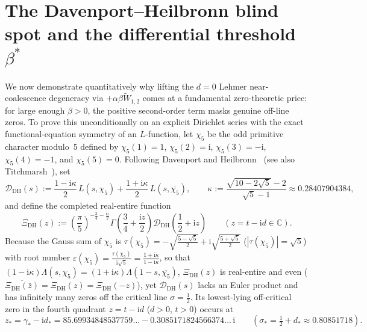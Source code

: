 \documentclass[11pt,reqno]{amsart}
\theoremstyle{definition}
\theoremstyle{remark}
\numberwithin{equation}{section}
\newcommand{\C}{\mathbb{C}}
\newcommand{\ii}{\mathrm{i}}
\begin{document}
\section{The Davenport--Heilbronn blind spot and the differential threshold $\beta^*$}\label{sec:dh_blind_spot}

We now demonstrate quantitatively why lifting the $d = 0$ Lehmer near-coalescence degeneracy via $+\alpha\beta\widetilde{W}_{1,2}$ comes at a fundamental zero-theoretic price: for large enough $\beta > 0$, the positive second-order term masks genuine off-line zeros. To prove this unconditionally on an explicit Dirichlet series with the exact functional-equation symmetry of an $L$-function, let $\chi_5$ be the odd primitive character modulo~$5$ defined by $\chi_5(1) = 1$, $\chi_5(2) = \ii$, $\chi_5(3) = -\ii$, $\chi_5(4) = -1$, and $\chi_5(5) = 0$. Following Davenport and Heilbronn~\cite{davenportheilbronn1936} (see also Titchmarsh~\cite[\S10.25]{titchmarsh1986}), set
\begin{equation}\label{eq:dh_definition}
\mathcal{D}_{\mathrm{DH}}(s) := \frac{1 - \ii\kappa}{2}\,L(s, \chi_5) + \frac{1 + \ii\kappa}{2}\,L(s, \overline{\chi_5}), \qquad \kappa := \frac{\sqrt{10 - 2\sqrt{5}} - 2}{\sqrt{5} - 1} \approx 0.28407904384,
\end{equation}
and define the completed real-entire function
\begin{equation}\label{eq:Xi_dh_definition}
\Xi_{\mathrm{DH}}(z) := \left(\frac{\pi}{5}\right)^{-\frac{3}{4} - \frac{\ii z}{2}}\Gamma\left(\frac{3}{4} + \frac{\ii z}{2}\right)\mathcal{D}_{\mathrm{DH}}\left(\frac{1}{2} + \ii z\right) \qquad (z = t - \ii d \in \C).
\end{equation}
Because the Gauss sum of $\chi_5$ is $\tau(\chi_5) = -\sqrt{\frac{5 - \sqrt{5}}{2}} + \ii\sqrt{\frac{5 + \sqrt{5}}{2}}$ ($|\tau(\chi_5)| = \sqrt{5}$) with root number $\varepsilon(\chi_5) = \frac{\tau(\chi_5)}{\ii\sqrt{5}} = \frac{1 + \ii\kappa}{1 - \ii\kappa}$, so that $(1 - \ii\kappa)\Lambda(s,\chi_5) = (1 + \ii\kappa)\Lambda(1-s,\overline{\chi_5})$, $\Xi_{\mathrm{DH}}(z)$ is real-entire and even ($\overline{\Xi_{\mathrm{DH}}(\bar{z})} = \Xi_{\mathrm{DH}}(z) = \Xi_{\mathrm{DH}}(-z)$), yet $\mathcal{D}_{\mathrm{DH}}(s)$ lacks an Euler product and has infinitely many zeros off the critical line $\sigma = \frac{1}{2}$. Its lowest-lying off-critical zero in the fourth quadrant $z = t - \ii d$ ($d > 0$, $t > 0$) occurs at
\begin{equation}\label{eq:dh_first_offline_zero}
z_* = \gamma_* - \ii d_* = 85.69934848537759\ldots - 0.3085171824566374\ldots\,\ii \qquad (\sigma_* = \tfrac{1}{2} + d_* \approx 0.80851718).
\end{equation}
\end{document}
